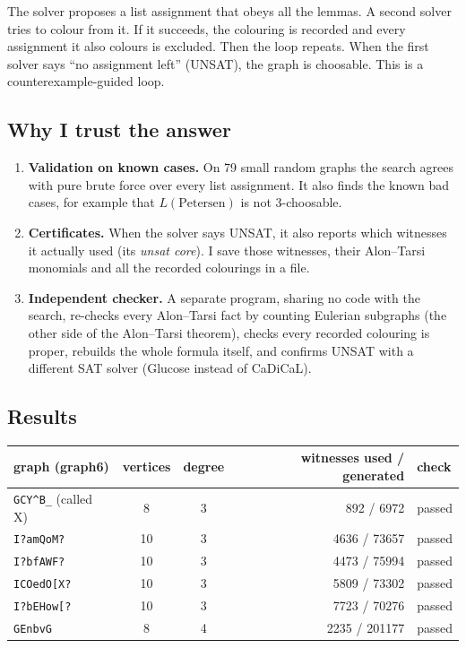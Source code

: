 \documentclass[11pt]{article}
\theoremstyle{plain}
\theoremstyle{definition}
\begin{document}
The solver proposes a list assignment that obeys all the lemmas. A second solver tries to
colour from it. If it succeeds, the colouring is recorded and every assignment it also
colours is excluded. Then the loop repeats. When the first solver says ``no assignment left''
(UNSAT), the graph is choosable. This is a counterexample-guided loop.

\subsection{Why I trust the answer}

\begin{enumerate}[leftmargin=*]
  \item \textbf{Validation on known cases.} On 79 small random graphs the search agrees with pure
        brute force over every list assignment. It also finds the known bad cases, for example
        that $L(\text{Petersen})$ is not 3-choosable.
  \item \textbf{Certificates.} When the solver says UNSAT, it also reports which witnesses it
        actually used (its \emph{unsat core}). I save those witnesses, their Alon--Tarsi
        monomials and all the recorded colourings in a file.
  \item \textbf{Independent checker.} A separate program, sharing no code with the search,
        re-checks every Alon--Tarsi fact by counting Eulerian subgraphs (the other side of the
        Alon--Tarsi theorem), checks every recorded colouring is proper, rebuilds the whole
        formula itself, and confirms UNSAT with a different SAT solver (Glucose instead of
        CaDiCaL).
\end{enumerate}

\subsection{Results}

\begin{center}
\begin{tabular}{lccrl}
\toprule
graph (graph6) & vertices & degree & witnesses used / generated & check \\
\midrule
\texttt{GCY\^{}B\_} (called X) & 8 & 3 & 892 / 6972 & passed \\
\texttt{I?\textasciigrave{}amQoM?} & 10 & 3 & 4636 / 73657 & passed \\
\texttt{I?\textasciigrave{}bfAWF?} & 10 & 3 & 4473 / 75994 & passed \\
\texttt{ICOedO[X?} & 10 & 3 & 5809 / 73302 & passed \\
\texttt{I?bEHow[?} & 10 & 3 & 7723 / 70276 & passed \\
\texttt{GEnbvG} & 8 & 4 & 2235 / 201177 & passed \\
\bottomrule
\end{tabular}
\end{center}
\end{document}
